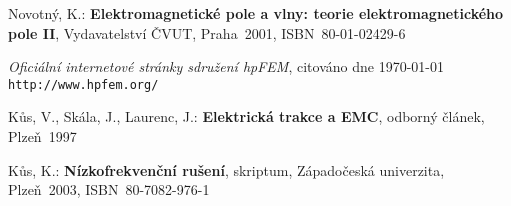 
%


\begin{thebibliography}{9}
{\sc Novotný, K.:}  {\bf Elektromagnetické pole a vlny: teorie elektromagnetického pole II},
Vydavatelství ČVUT, Praha~2001, \mbox{ISBN 80-01-02429-6}

{\em Oficiální internetové stránky sdružení hpFEM},
citováno dne \today \\
\texttt{http://www.hpfem.org/}

{\sc Kůs, V., Skála, J., Laurenc, J.:}  {\bf Elektrická trakce a EMC},
odborný článek, Plzeň~1997

{\sc Kůs, K.:}  {\bf Nízkofrekvenční rušení},
skriptum, Západočeská univerzita, Plzeň~2003, \mbox{ISBN 80-7082-976-1}

\end{thebibliography}

